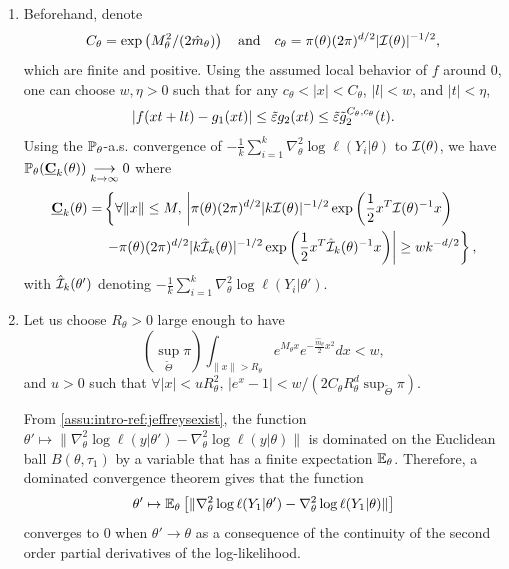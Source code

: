 \begin{proofb}
\begin{enumerate}
    \item Beforehand, denote
    \begin{equation}
        C_\theta =\exp\left(M_\theta^2/(2\hat m_\theta)\right) \quad\text{and}\quad  c_\theta = \pi(\theta)(2\pi)^{d/2}|\mathcal{I}(\theta)|^{-1/2} ,
    \end{equation}
    which are finite and positive. Using the assumed local behavior of $f$ around $0$, one can choose $ w,\eta>0$ such that for any $c_\theta<|x|<C_\theta$, $|l|< w$, and $|t|<\eta$, 
    \begin{equation}\label{eq:PSGSA:asymptdevf}
        |f(xt+lt)-g_1(xt)|\leq\tilde{\varepsilon} g_2(xt)\leq\tilde{\varepsilon}\tilde g_2^{C_\theta,c_\theta}(t).    
    \end{equation}
    Using the $\mathbb{P}_\theta$-a.s. convergence of $-\frac{1}{k}\sum_{i=1}^k\nabla^2_\theta\log\ell(Y_i|\theta)$ to $\mathcal{I}(\theta)$, we have $\mathbb{P}_\theta( \underline{\mathbf{C}}_k(\theta))\overset{\ }{\underset{k\rightarrow\infty}{\longrightarrow}}0$ where
    \begin{align}
    \nonumber
         \underline{\mathbf{C}}_k(\theta) = &\left\{\forall \|x\|\leq M,\, \left|\pi(\theta)(2\pi)^{d/2}|k\mathcal{I}(\theta)|^{-1/2}\exp\left(\frac{1}{2}x^T \mathcal{I}(\theta)^{-1}x\right) \right.\right. \\
        & \left.\left. - \pi(\theta)(2\pi)^{d/2}|k\hat{\mathcal{I}}_k(\theta)|^{-1/2}\exp\left(\frac{1}{2}x^T \hat{\mathcal{I}}_k(\theta)^{-1} x\right) \right|\geq w k^{-d/2}\right\} ,
    \end{align}
    with $\hat{\mathcal{I}}_k(\theta')$ denoting $-\frac{1}{k}\sum_{i=1}^k\nabla^2_\theta\log\ell(Y_i|\theta')$.
    
    \item 
    Let us choose $R_\theta>0$ large enough to have 
    \begin{equation}\label{eq:PSGSA:majorintegralsR}
        (\sup_{\tilde\Theta}\pi ) \int_{\|x\|>R_\theta} e^{M_\theta x}e^{-\frac{\hat m_\theta}{2}x^2} dx< w ,    
    \end{equation}
and $u>0$ such that $\forall|x|<uR_\theta^2,\,|e^{x}-1|< w/(2 C_\theta R^d_\theta\sup_{\tilde\Theta}\pi )$. 

From \cref{assu:intro-ref:jeffreysexist}, the function $\theta'\mapsto\|\nabla_\theta^2\log\ell(y|\theta')-\nabla^2_\theta\log\ell(y|\theta)\|$ is dominated on the Euclidean ball $B(\theta,\tau_1)$ by a variable that has a finite expectation $\mathbb{E}_\theta$. Therefore, a dominated convergence theorem gives that the function
    \begin{equation}
        \theta'\mapsto \mathbb{E}_\theta \left[\|\nabla_\theta^2\log\ell(Y_1|\theta')-\nabla^2_\theta\log\ell(Y_1|\theta)\|\right]
    \end{equation}
    converges to $0$ when $\theta'\to\theta$ as a consequence of the continuity of the second order partial derivatives of the log-likelihood. 
    

\end{enumerate}
\end{proofb}
